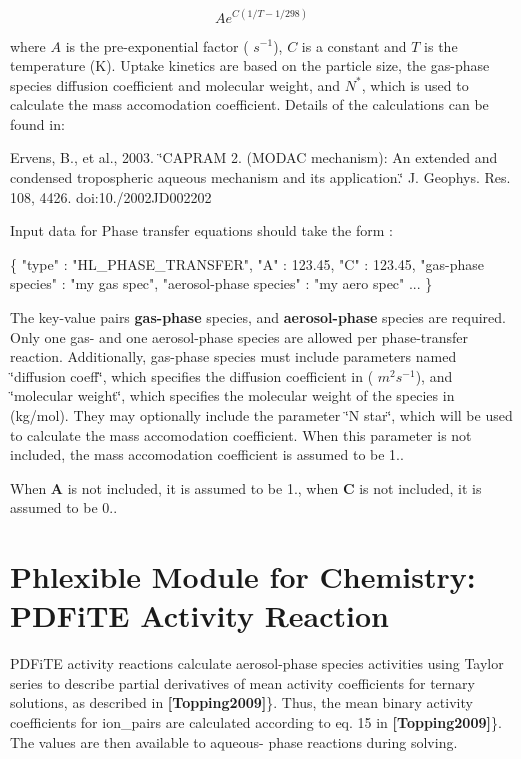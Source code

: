\[ Ae^{C({1/T-1/298})} \]

where $A$ is the pre-\/exponential factor ( $s^{-1}$), $C$ is a constant and $T$ is the temperature (K). Uptake kinetics are based on the particle size, the gas-\/phase species diffusion coefficient and molecular weight, and $N^{*}$, which is used to calculate the mass accomodation coefficient. Details of the calculations can be found in\+:

Ervens, B., et al., 2003. \char`\"{}\+C\+A\+P\+R\+A\+M 2. (\+M\+O\+D\+A\+C mechanism)\+: An extended
 and condensed tropospheric aqueous mechanism and its application.\char`\"{} J. Geophys. Res. 108, 4426. doi\+:10./2002\+J\+D002202

Input data for Phase transfer equations should take the form \+: 
\begin{DoxyCode}
\{
  "type" : "HL\_PHASE\_TRANSFER",
  "A" : 123.45,
  "C" : 123.45,
  "gas-phase species" : "my gas spec",
  "aerosol-phase species" : "my aero spec"
    ...
\}
\end{DoxyCode}
 The key-\/value pairs {\bfseries gas-\/phase} species, and {\bfseries aerosol-\/phase} species are required. Only one gas-\/ and one aerosol-\/phase species are allowed per phase-\/transfer reaction. Additionally, gas-\/phase species must include parameters named \char`\"{}diffusion coeff\char`\"{}, which specifies the diffusion coefficient in ( $m^2s^{-1}$), and \char`\"{}molecular weight\char`\"{}, which specifies the molecular weight of the species in (kg/mol). They may optionally include the parameter \char`\"{}\+N star\char`\"{}, which will be used to calculate the mass accomodation coefficient. When this parameter is not included, the mass accomodation coefficient is assumed to be 1..

When {\bfseries A} is not included, it is assumed to be 1., when {\bfseries C} is not included, it is assumed to be 0.. \hypertarget{phlex_rxn_PDFiTE_activity}{}\section{Phlexible Module for Chemistry\+: P\+D\+Fi\+TE Activity Reaction}\label{phlex_rxn_PDFiTE_activity}
P\+D\+Fi\+TE activity reactions calculate aerosol-\/phase species activities using Taylor series to describe partial derivatives of mean activity coefficients for ternary solutions, as described in {\bfseries [Topping2009]}\}. Thus, the mean binary activity coefficients for ion\+\_\+pairs are calculated according to eq. 15 in {\bfseries [Topping2009]}\}. The values are then available to aqueous-\/ phase reactions during solving.

